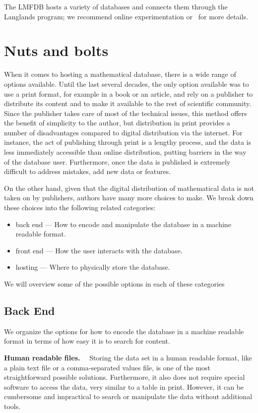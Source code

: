 \documentclass{amsart}
\newcommand{\subhead}[1]{\vspace{0.1in} \noindent \textbf{#1.}\ \ }
\begin{document}
The LMFDB hosts a variety of databases and connects them through the Langlands program; we recommend online experimentation or~\cite{cremona-16} for more details.


\section{Nuts and bolts}
\label{sec:nutsbolts}

When it comes to hosting a mathematical database, there is a wide range of options available.
Until the last several decades, the only option available was to use a print format, for example in a book or an article, and rely on a publisher to distribute its content and to make it available to the rest of scientific community.
Since the publisher takes care of most of the technical issues, this method offers the benefit of simplicity to the author, but distribution in print provides a number of disadvantages compared to digital distribution via the internet.
For instance, the act of publishing through print is a lengthy process, and the data is less immediately accessible than online distribution, putting barriers in the way of the database user.
Furthermore, once the data is published is extremely difficult to address  mistakes, add new data or features.

On the other hand, given that the digital distribution of mathematical data is not taken on by publishers, authors have many more choices to make.
We break down these choices into the following related categories:
\begin{itemize}
  \item back end --- How to encode and manipulate the database in a machine readable format.
  \item front end --- How the user interacts with the database.
  \item hosting --- Where to physically store the database.
\end{itemize}
We will overview some of the possible options in each of these categories

\subsection{Back End}

We organize the options for how to encode the database in a machine readable format in terms of how easy it is to search for content.


\subhead{Human readable files}
     Storing the data set in a human readable format, like a  plain text file or a comma-separated values file, is one of the most straightforward possible solutions.
    Furthermore, it also does not require special software to access the data, very similar to a table in print.
    However, it can be cumbersome and impractical to search or manipulate the data without additional tools.
\end{document}

